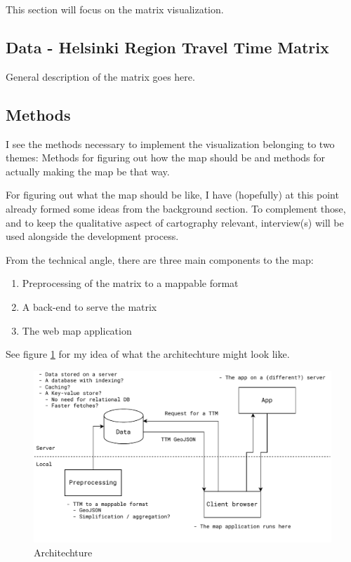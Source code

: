 \documentclass[12pt]{article}
\begin{document}
This section will focus on the matrix visualization.

\subsection{Data - Helsinki Region Travel Time Matrix}

General description of the matrix goes here.

\subsection{Methods}

I see the methods necessary to implement the visualization belonging to two themes:
Methods for figuring out how the map should be
and methods for actually making the map be that way.

For figuring out what the map should be like,
I have (hopefully) at this point already formed some ideas from the background section.
To complement those, and to keep the qualitative aspect of cartography relevant,
interview(s) will be used alongside the development process.

From the technical angle, there are three main components to the map:

\begin{enumerate}
	\item Preprocessing of the matrix to a mappable format
	\item A back-end to serve the matrix
	\item The web map application
\end{enumerate}

See figure \ref{fig:architechture} for my idea of what the architechture might look like.

\begin{figure}[H]
	\centering
	\includegraphics[width=1\textwidth]{images/architechture}
	\caption{Architechture}
	\label{fig:architechture}
\end{figure}
\end{document}
